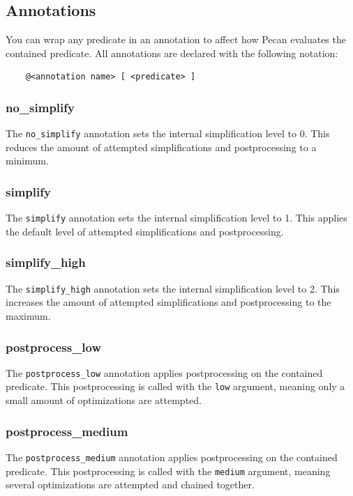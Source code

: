\documentclass{report}
\begin{document}
\subsection{Annotations}
You can wrap any predicate in an annotation to affect how Pecan evaluates the contained predicate.
All annotations are declared with the following notation:
\begin{verbatim}
    @<annotation name> [ <predicate> ]
\end{verbatim}

\subsubsection{no\_simplify}
The \verb+no_simplify+ annotation sets the internal simplification level to 0.
This reduces the amount of attempted simplifications and postprocessing to a minimum.

\subsubsection{simplify}
The \verb+simplify+ annotation sets the internal simplification level to 1.
This applies the default level of attempted simplifications and postprocessing.

\subsubsection{simplify\_high}
The \verb+simplify_high+ annotation sets the internal simplification level to 2.
This increases the amount of attempted simplifications and postprocessing to the maximum.

\subsubsection{postprocess\_low}
The \verb+postprocess_low+ annotation applies postprocessing on the contained predicate.
This postprocessing is called with the \verb+low+ argument, meaning only a small amount of optimizations are attempted.

\subsubsection{postprocess\_medium}
The \verb+postprocess_medium+ annotation applies postprocessing on the contained predicate.
This postprocessing is called with the \verb+medium+ argument, meaning several optimizations are attempted and chained together.
\end{document}
